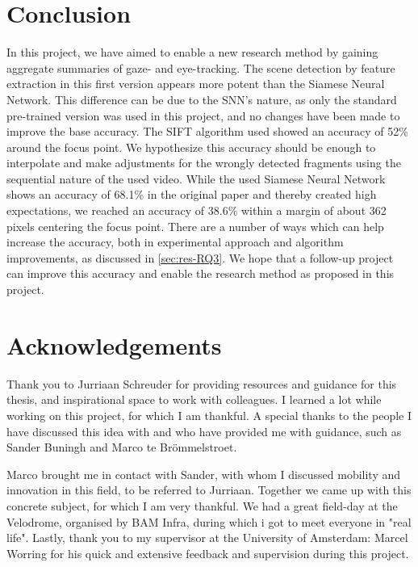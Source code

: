 \documentclass[sigconf, natbib=false, nonacm]{acmart}
\begin{document}
\section{Conclusion}
    In this project, we have aimed to enable a new research method by gaining aggregate summaries of gaze- and eye-tracking. The scene detection by feature extraction in this first version appears more potent than the Siamese Neural Network. This difference can be due to the SNN's nature, as only the standard pre-trained version was used in this project, and no changes have been made to improve the base accuracy. The SIFT algorithm used showed an accuracy of 52\% around the focus point. We hypothesize this accuracy should be enough to interpolate and make adjustments for the wrongly detected fragments using the sequential nature of the used video. While the used Siamese Neural Network shows an accuracy of 68.1\% in the original paper \cite{Chen2020a} and thereby created high expectations, we reached an accuracy of 38.6\% within a margin of about 362 pixels centering the focus point. There are a number of ways which can help increase the accuracy, both in experimental approach and algorithm improvements, as discussed in \autoref{sec:res-RQ3}. We hope that a follow-up project can improve this accuracy and enable the research method as proposed in this project. 
     
\section{Acknowledgements}
    Thank you to Jurriaan Schreuder for providing resources and guidance for this thesis, and inspirational space to work with colleagues. I learned a lot while working on this project, for which I am thankful. A special thanks to the people I have discussed this idea with and who have provided me with guidance, such as Sander Buningh and Marco te Brömmelstroet. 
    
    Marco brought me in contact with Sander, with whom I discussed mobility and innovation in this field, to be referred to Jurriaan. Together we came up with this concrete subject, for which I am very thankful. We had a great field-day at the Velodrome, organised by BAM Infra, during which i got to meet everyone in "real life". Lastly, thank you to my supervisor at the University of Amsterdam: Marcel Worring for his quick and extensive feedback and supervision during this project. 
\end{document}
